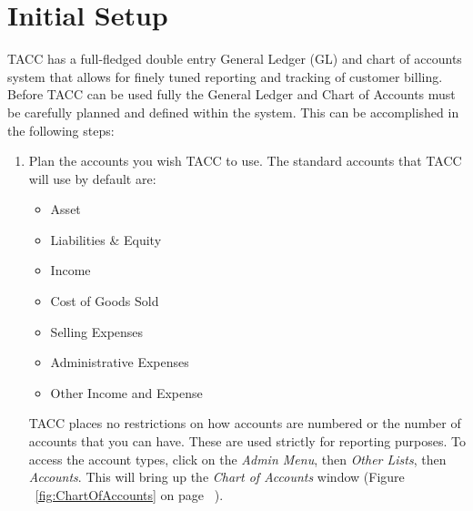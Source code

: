 \chapter{Initial Setup}

TACC has a full-fledged double entry General Ledger (GL) and chart of
accounts system that allows for finely tuned reporting and tracking of
customer billing.  Before TACC can be used fully the General Ledger and
Chart of Accounts must be carefully planned and defined within the
system.  This can be accomplished in the following steps:

\begin{enumerate}
\item Plan the accounts you wish TACC to use.  The standard accounts
that TACC will use by default are:
\begin{itemize}
\item Asset
\item Liabilities \& Equity
\item Income
\item Cost of Goods Sold
\item Selling Expenses
\item Administrative Expenses
\item Other Income and Expense
\end{itemize}
TACC places no restrictions on how accounts are numbered or the number
of accounts that you can have.  These are used strictly for reporting
purposes.  To access the account types, click on the \emph{Admin Menu}, then
\emph{Other Lists}, then \emph{Accounts}.  This will bring up the
\emph{Chart of Accounts} window (Figure ~\ref{fig:ChartOfAccounts} on
page ~\pageref{fig:ChartOfAccounts}).


\end{enumerate}
